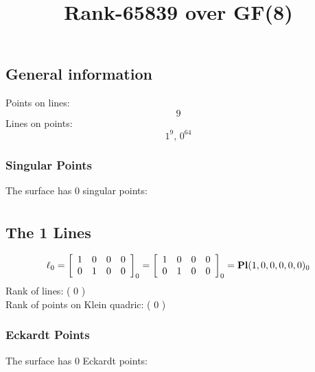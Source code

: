 \documentclass{article}
\newcommand\setTBstruts{\def\T{\rule{0pt}{2.6ex}}%
\def\B{\rule[-1.2ex]{0pt}{0pt}}}
\begin{document}
 
\setTBstruts



{\allowdisplaybreaks%






\title{Rank-65839 over GF(8)}
\author{}%
\maketitle%
%
{}



\subsection*{General information}
Points on lines:
$$
9$$
Lines on points:
$$
1^9,\,0^{64}$$
\subsubsection*{Singular Points}
The surface has 0 singular points:\\
\begin{align*}
\end{align*}
\subsection*{The 1 Lines}
$$
\ell_{0} = 
\left[
\begin{array}{*{4}{r}}
1 & 0 & 0 & 0\\
0 & 1 & 0 & 0\\
\end{array}
\right]
_{0}
=
\left[
\begin{array}{*{4}c}
1  & 0  & 0  & 0\\
0  & 1  & 0  & 0\\
\end{array}
\right]_{0}
={\rm\bf Pl}(1,0,0,0,0,0 )_{0}$$
Rank of lines: ( 0 )\\
Rank of points on Klein quadric: ( 0 )\\
\subsubsection*{Eckardt Points}
The surface has 0 Eckardt points:\\
}
\end{document}

